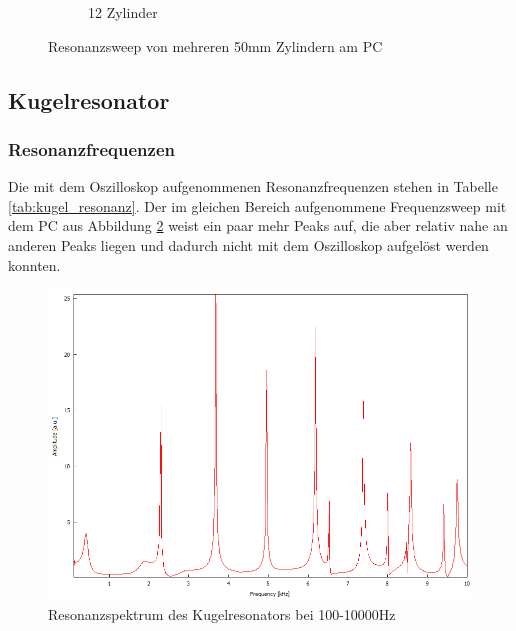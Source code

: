 \begin{figure}
\begin{subfigure}{0.32\textwidth}
    \caption{12 Zylinder}
  \end{subfigure}
  \caption{Resonanzsweep von mehreren 50mm Zylindern am PC}
  \label{fig:plot_zylinder_sweep}
\end{figure}

\subsection{Kugelresonator}
\subsubsection{Resonanzfrequenzen}
Die mit dem Oszilloskop aufgenommenen Resonanzfrequenzen stehen in Tabelle \ref{tab:kugel_resonanz}.
Der im gleichen Bereich aufgenommene Frequenzsweep mit dem PC aus Abbildung \ref{fig:kugel_resonanz} weist ein paar mehr Peaks auf,
die aber relativ nahe an anderen Peaks liegen und dadurch nicht mit dem Oszilloskop aufgelöst werden konnten.

\begin{figure}
  \centering
  \includegraphics{Bilder/PC_Kugelresonator/180_100-10000Hz.png}
  \caption{Resonanzspektrum des Kugelresonators bei 100-10000Hz}
  \label{fig:kugel_resonanz}
\end{figure}